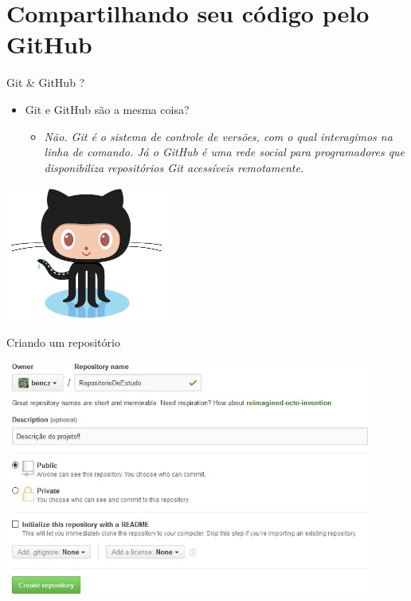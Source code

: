 \section{Compartilhando seu código pelo GitHub}

\begin{slide}[method=direct]{Git \& GitHub ?}
	\begin{itemize}
		\item{Git e GitHub são a mesma coisa?}
		\begin{itemize}
		\item{\textit{Não. Git é o sistema de controle de versões, com o qual interagimos na linha de comando. Já o GitHub é uma 					rede social para programadores que disponibiliza repositórios Git acessíveis remotamente.}}
		\end{itemize}
	\end{itemize}

	\begin{center}
	\includegraphics[width=0.4\textwidth,natwidth=800,natheight=600]{./imagens/Octocat.png}
	\end{center}
\end{slide}

\begin{slide}[method=direct]{Criando um repositório}
	\begin{center}
	\includegraphics[width=0.9\textwidth,natwidth=711,natheight=457]{./imagens/criando_repo.png}
	\end{center}
\end{slide}

